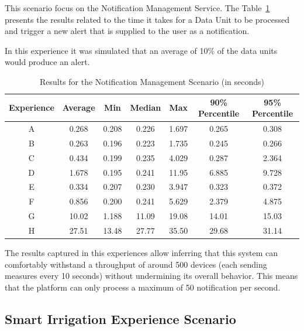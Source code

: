 This scenario focus on the Notification Management Service. The Table~\ref{tab:evaluation:experiences:notification:results} presents the results related to the time it takes for a Data Unit to be processed and trigger a new alert that is supplied to the user as a notification.

In this experience it was simulated that an average of 10\% of the data units would produce an alert.

\begin{table}[H]
    \caption{Results for the Notification Management Scenario (in seconds)}
    \label{tab:evaluation:experiences:notification:results}
    \centering
    \begin{tabular}{@{}ccccccc@{}}
    \toprule
    \textbf{Experience} & \textbf{Average} & \textbf{Min} & \textbf{Median} & \textbf{Max} & \textbf{90\% Percentile} & \textbf{95\% Percentile} \\ \midrule
    A & 0.268 & 0.208 & 0.226 & 1.697 & 0.265 & 0.308 \\ \midrule
    B & 0.263 & 0.196 & 0.223 & 1.735 & 0.245 & 0.266 \\ \midrule
    C & 0.434 & 0.199 & 0.235 & 4.029 & 0.287 & 2.364 \\ \midrule
    D & 1.678 & 0.195 & 0.241 & 11.95 & 6.885 & 9.728 \\ \midrule
    E & 0.334 & 0.207 & 0.230 & 3.947 & 0.323 & 0.372 \\ \midrule
    F & 0.856 & 0.200 & 0.241 & 5.629 & 2.379 & 4.875 \\ \midrule
    G & 10.02 & 1.188 & 11.09 & 19.08 & 14.01 & 15.03 \\ \midrule
    H & 27.51 & 13.48 & 27.77 & 35.50 & 29.68 & 31.14 \\ \bottomrule
    \end{tabular}
\end{table}

The results captured in this experiences allow inferring that this system can comfortably withstand a throughput of around 500 devices (each sending measures every 10 seconds) without undermining its overall behavior. This means that the platform can only process a maximum of 50 notification per second. 

\subsection{Smart Irrigation Experience Scenario}
\label{subsec:evaluation:experiences:irrigation}

